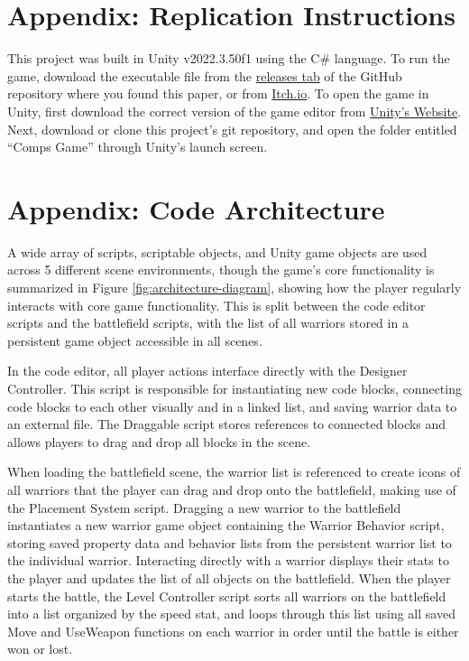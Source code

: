 \documentclass[10pt,twocolumn]{article}
\begin{document}

\sloppy
\printbibliography


\newpage

\appendix

\section{Appendix: Replication Instructions}
This project was built in Unity v2022.3.50f1 using the C\# language. To run the game, download the executable file from the \href{https://github.com/slevy14/Comps-Game/releases/tag/Release}{releases tab} of the GitHub repository where you found this paper, or from \href{https://leafguy.itch.io/magicode}{Itch.io}. To open the game in Unity, first download the correct version of the game editor from \href{https://unity.com/releases/2022-lts}{Unity's Website}. Next, download or clone this project's git repository, and open the folder entitled ``Comps Game'' through Unity's launch screen.

\section{Appendix: Code Architecture}
A wide array of scripts, scriptable objects, and Unity game objects are used across 5 different scene environments, though the game’s core functionality is summarized in Figure \ref{fig:architecture-diagram}, showing how the player regularly interacts with core game functionality. This is split between the code editor scripts and the battlefield scripts, with the list of all warriors stored in a persistent game object accessible in all scenes.

In the code editor, all player actions interface directly with the Designer Controller. This script is responsible for instantiating new code blocks, connecting code blocks to each other visually and in a linked list, and saving warrior data to an external file. The Draggable script stores references to connected blocks and allows players to drag and drop all blocks in the scene.

When loading the battlefield scene, the warrior list is referenced to create icons of all warriors that the player can drag and drop onto the battlefield, making use of the Placement System script. Dragging a new warrior to the battlefield instantiates a new warrior game object containing the Warrior Behavior script, storing saved property data and behavior lists from the persistent warrior list to the individual warrior. Interacting directly with a warrior displays their stats to the player and updates the list of all objects on the battlefield. When the player starts the battle, the Level Controller script sorts all warriors on the battlefield into a list organized by the speed stat, and loops through this list using all saved Move and UseWeapon functions on each warrior in order until the battle is either won or lost.
\end{document}

